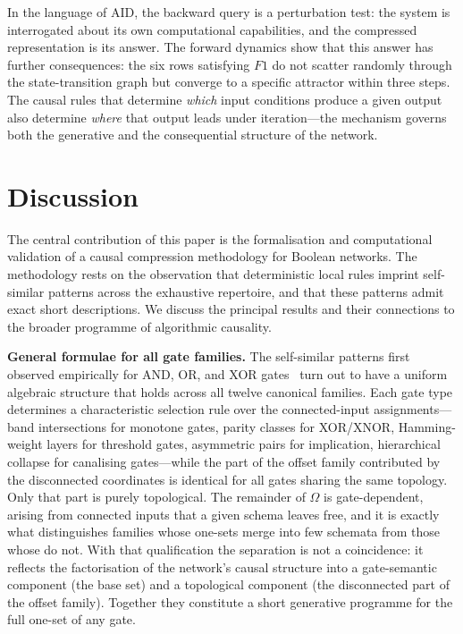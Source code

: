 \documentclass[11pt]{article}
\begin{document}
In the language of AID, the backward query is a perturbation test: the
system is interrogated about its own computational capabilities, and the
compressed representation is its answer.  The forward dynamics show that
this answer has further consequences: the six rows satisfying $F1$ do not
scatter randomly through the state-transition graph but converge to a
specific attractor within three steps.  The causal rules that determine
\emph{which} input conditions produce a given output also determine
\emph{where} that output leads under iteration---the mechanism governs both
the generative and the consequential structure of the network.


\section{Discussion}\label{sec:discussion}

The central contribution of this paper is the formalisation and
computational validation of a causal compression methodology for Boolean
networks.  The methodology rests on the observation that deterministic
local rules imprint self-similar patterns across the exhaustive
repertoire, and that these patterns admit exact short descriptions.
We discuss the principal results and their connections to the broader
programme of algorithmic causality.

\textbf{General formulae for all gate families.}  The self-similar
patterns first observed empirically for AND, OR, and XOR
gates~\cite{hernandez2019} turn out to have a uniform algebraic
structure that holds across all twelve canonical families.  Each gate
type determines a characteristic selection rule over the connected-input
assignments---band intersections for monotone gates, parity classes for
XOR/XNOR, Hamming-weight layers for threshold gates, asymmetric pairs
for implication, hierarchical collapse for canalising gates---while the
part of the offset family contributed by the disconnected coordinates is
identical for all gates sharing the same topology.  Only that part is purely
topological.  The remainder of $\Omega$ is gate-dependent, arising from
connected inputs that a given schema leaves free, and it is exactly what
distinguishes families whose one-sets merge into few schemata from those whose
do not.  With that qualification the separation is not a coincidence:
it reflects the factorisation of the network's causal structure into a
gate-semantic component (the base set) and a topological component (the
disconnected part of the offset family).  Together they constitute a short
generative programme for the full one-set of any gate.
\end{document}
